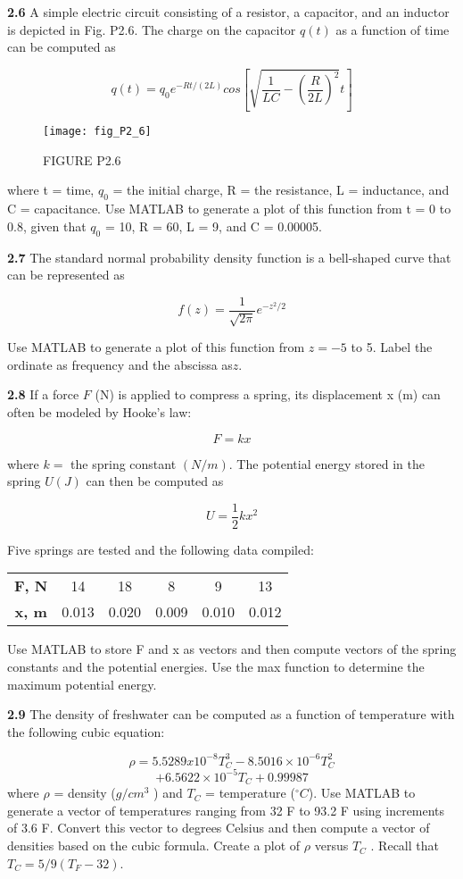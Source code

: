 \documentclass[../main.tex]{subfiles}
\begin{document}
\begin{multicols}{2}
\textbf{2.6} A simple electric circuit consisting of a resistor, a capacitor, and an inductor is depicted in Fig. P2.6. The charge
on the capacitor $q(t)$ as a function of time can be computed
as

$$q(t)=q_0e^{-Rt/(2L)}cos \left[\sqrt{ \dfrac{1}{LC}-\left(\dfrac{R}{2L} \right)^2 }t\right]$$


\begin{figure}[H]
	\centering
	\texttt{[image: fig\_P2\_6]}
   \caption*{\textsf{FIGURE P2.6}}
   \label{fig_P2.6}
\end{figure}

where t = time, $q_0$ = the initial charge, R = the resistance,
L = inductance, and C = capacitance. Use MATLAB to
generate a plot of this function from t = 0 to 0.8, given that
$q_0$ = 10, R = 60, L = 9, and C = 0.00005.


\textbf{2.7} The standard normal probability density function is a
bell-shaped curve that can be represented as

$$f(z)=\dfrac{1}{\sqrt{2\pi}}e^{-z^2/2} $$

Use MATLAB to generate a plot of this function from
$z = -5$ to 5. Label the ordinate as frequency and the abscissa as$ z$.


\textbf{2.8} If a force $F$ (N) is applied to compress a spring, its displacement x (m) can often be modeled by Hooke's law:

$$F=kx $$


where $k =$ the spring constant $(N/m)$. The potential energy
stored in the spring $U (J)$ can then be computed as


$$U=\dfrac{1}{2}kx^2 $$

Five springs are tested and the following data compiled:

\begin{tabular}{cccccc}
	\hline
	\textbf{F, N} &14 &18& 8 &9& 13\\
	\textbf{x, m}& 0.013 &0.020& 0.009& 0.010& 0.012\\
	\hline
	
\end{tabular}
Use MATLAB to store F and x as vectors and then compute
vectors of the spring constants and the potential energies.
Use the max function to determine the maximum potential
energy.


\textbf{2.9} The density of freshwater can be computed as a function
of temperature with the following cubic equation:


$$ \rho =5.5289x10^{-8}T_C^3-8.5016 \times 10^{-6}T_C^2 $$
$$+6.5622 \times 10^{-5}T_C+0.99987$$
where $\rho$ = density ($g/cm^3$
) and $T_C$ = temperature ($^{\circ} C$). Use
MATLAB to generate a vector of temperatures ranging from
32 F to 93.2 F using increments of 3.6 F. Convert this vector to degrees Celsius and then compute a vector of densities
based on the cubic formula. Create a plot of $\rho$ versus $T_C$ .
Recall that $T_C = 5/9(T_F - 32)$.



\end{multicols}
\end{document}
